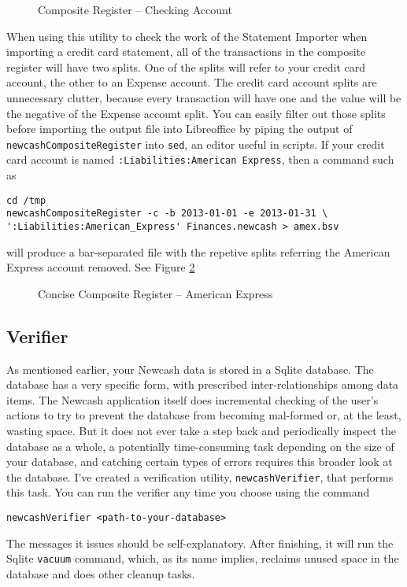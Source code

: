 \documentclass{report}
\newcommand{\graphicsfig}[5]{
\begin{figure}[#5]
\begin{center}
\resizebox{#1}{!}{\texttt{[image: \#2]}}
\end{center}
\caption{#3}
\label{#4}
\end{figure}
}
\begin{document}
\graphicsfig{5in}{figures/composite_register_checking.png}{Composite Register -- Checking Account}{Composite Register -- Checking Account}{}

When using this utility to check the work of the Statement Importer when importing a credit card statement, all of the transactions in the composite register will have two splits. One of the splits will refer to your credit card account, the other to an Expense account. The credit card account splits are unnecessary clutter, because every transaction will have one and the value will be the negative of the Expense account split. You can easily filter out those splits before importing the output file into Libreoffice by piping the output of \verb|newcashCompositeRegister| into \verb|sed|, an editor useful in scripts. If your credit card account is named \verb|:Liabilities:American Express|, then a command such as
\begin{verbatim}
cd /tmp
newcashCompositeRegister -c -b 2013-01-01 -e 2013-01-31 \
':Liabilities:American_Express' Finances.newcash > amex.bsv
\end{verbatim}
will produce a bar-separated file with the repetive splits referring the American Express account removed. See Figure \ref{Concise Composite Register -- American Express} 
\graphicsfig{5in}{figures/composite_register_amex.png}{Concise Composite Register -- American Express}{Concise Composite Register -- American Express}{}

\subsection{Verifier}
As mentioned earlier, your Newcash data is stored in a Sqlite database. The database has a very specific form,  with prescribed inter-relationships among data items. The Newcash application itself does incremental checking of the user's actions
to try to prevent the database from becoming mal-formed or, at the least, wasting space. But it does not ever take a step back and periodically inspect the database as a whole, a potentially time-consuming task depending on the size of your database, and  catching certain types of errors requires this broader look at the database. I've created a verification utility, \verb|newcashVerifier|, that performs this task. You can run the verifier any time you choose using the command
\begin{verbatim}
newcashVerifier <path-to-your-database>
\end{verbatim}
The messages it issues should be self-explanatory. After finishing, it will run the Sqlite \verb|vacuum| command, which, as its name implies, reclaims unused space in the database and does other cleanup tasks.
\end{document}
